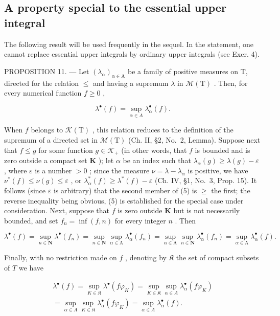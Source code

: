 \subsection{A property special to the essential upper integral}

The following result will be used frequently in the sequel. In the statement, one cannot replace essential upper integrals by ordinary upper integrals (see Exer. 4).

PROPOSITION 11. --- Let \((\lambda_{\alpha})_{\alpha\in\mathrm{A}}\) be a family of positive measures on T, directed for the relation \(\leqslant\) and having a supremum \(\lambda\) in \(\mathcal{M}(\mathrm{T})\) . Then, for every numerical function \(f\geqslant0\) ,

\[
\lambda^ {\bullet} (f) = \sup _ {\alpha \in A} \lambda_ {\alpha} ^ {\bullet} (f).\tag{5}
\]

When \(f\) belongs to \(\mathcal{K}(\mathrm{T})\) , this relation reduces to the definition of the supremum of a directed set in \(\mathcal{M}(\mathrm{T})\) (Ch. II, §2, No.~2, Lemma). Suppose next that \(f \leqslant g\) for some function \(g \in \mathcal{K}_+\) (in other words, that \(f\) is bounded and is zero outside a compact set \(\mathbf{K}\) ); let \(\alpha\) be an index such that \(\lambda_{\alpha}(g) \geqslant \lambda(g) - \varepsilon\) , where \(\varepsilon\) is a number \(>0\) ; since the measure \(\nu = \lambda - \lambda_{\alpha}\) is positive, we have \(\nu^{*}(f) \leqslant \nu(g) \leqslant \varepsilon\) , or \(\lambda_{\alpha}^{*}(f) \geqslant \lambda^{*}(f) - \varepsilon\) (Ch. IV, §1, No.~3, Prop. 15). It follows (since \(\varepsilon\) is arbitrary) that the second member of (5) is \(\geqslant\) the first; the reverse inequality being obvious, (5) is established for the special case under consideration. Next, suppose that \(f\) is zero outside \(\mathbf{K}\) but is not necessarily bounded, and set \(f_n = \inf(f, n)\) for every integer \(n\) . Then

\[
\lambda^ {\bullet} (f) = \sup _ {n \in \mathbf {N}} \lambda^ {\bullet} (f _ {n}) = \sup _ {n \in \mathbf {N}} \sup _ {\alpha \in \mathrm{A}} \lambda_ {\alpha} ^ {\bullet} (f _ {n}) = \sup _ {\alpha \in \mathrm{A}} \sup _ {n \in \mathbf {N}} \lambda_ {\alpha} ^ {\bullet} (f _ {n}) = \sup _ {\alpha \in \mathrm{A}} \lambda_ {\alpha} ^ {\bullet} (f).
\]

Finally, with no restriction made on \(f\) , denoting by \(\mathfrak{K}\) the set of compact subsets of \(T\) we have

\[
\begin{array}{c} \lambda^ {\bullet} (f) = \sup _ {K \in \mathfrak {K}} \lambda^ {\bullet} (f \varphi_ {K}) = \sup _ {K \in \mathfrak {K}} \sup _ {\alpha \in A} \lambda_ {\alpha} ^ {\bullet} (f \varphi_ {K}) \\ = \sup _ {\alpha \in A} \sup _ {K \in \mathfrak {K}} \lambda_ {\alpha} ^ {\bullet} (f \varphi_ {K}) = \sup _ {\alpha \in A} \lambda_ {\alpha} ^ {\bullet} (f). \end{array}
\]

